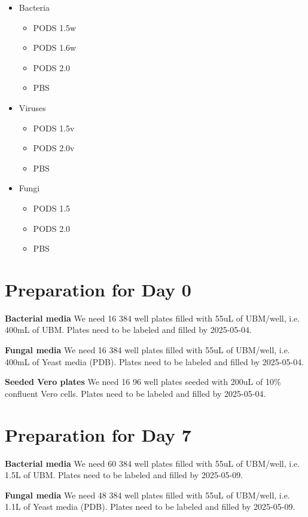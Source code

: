 \documentclass{article}
\begin{document}
\begin{itemize}
    \item Bacteria
        \begin{itemize}
            \item PODS 1.5w
            \item PODS 1.6w
            \item PODS 2.0
            \item PBS
        \end{itemize}
    \item Viruses
        \begin{itemize}
            \item PODS 1.5v
            \item PODS 2.0v
            \item PBS
        \end{itemize}
    \item Fungi
        \begin{itemize}
            \item PODS 1.5
            \item PODS 2.0
            \item PBS
        \end{itemize}
\end{itemize}


\newpage
\section{Preparation for Day 0}\label{sec:day0-prep}
\textbf{Bacterial media} We need 16 384 well plates filled with 55uL of UBM/well, i.e. 400mL of UBM. Plates need to be labeled and filled by 2025-05-04.

\textbf{Fungal media} We need 16 384 well plates filled with 55uL of UBM/well, i.e. 400mL of Yeast media (PDB). Plates need to be labeled and filled by 2025-05-04.

\textbf{Seeded Vero plates} We need 16 96 well plates seeded with 200uL of 10\% confluent Vero cells. Plates need to be labeled and filled by 2025-05-04.

\section{Preparation for Day 7}\label{sec:day7-prep}
\textbf{Bacterial media} We need 60 384 well plates filled with 55uL of UBM/well, i.e. 1.5L of UBM. Plates need to be labeled and filled by 2025-05-09.

\textbf{Fungal media} We need 48 384 well plates filled with 55uL of UBM/well, i.e. 1.1L of Yeast media (PDB). Plates need to be labeled and filled by 2025-05-09.
\end{document}
